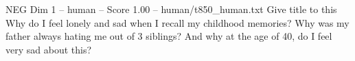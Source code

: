 \begin{textsample}{NEG Dim 1 – human – Score 1.00 – human/t850\_human.txt}  \label{ex:f1_neg_004}
Give title to this Why do I feel lonely and sad when I recall my childhood memories?
Why was my father always hating me out of 3 siblings?
And why at the age of 40, do I feel very sad about this?

\end{textsample}
